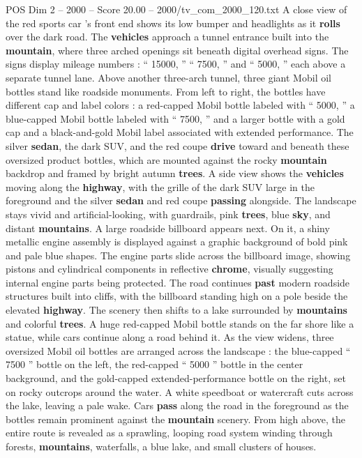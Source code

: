 \begin{textsample}{POS Dim 2 – 2000 – Score 20.00 – 2000/tv\_com\_2000\_120.txt}
A close view of the red sports car ’s front end shows its low bumper and headlights as it \textbf{rolls} over the dark road.
The \textbf{vehicles} approach a tunnel entrance built into the \textbf{mountain}, where three arched openings sit beneath digital overhead signs.
The signs display mileage numbers : “ 15000, ” “ 7500, ” and “ 5000, ” each above a separate tunnel lane.
Above another three-arch tunnel, three giant Mobil oil bottles stand like roadside monuments.
From left to right, the bottles have different cap and label colors : a red-capped Mobil bottle labeled with “ 5000, ” a blue-capped Mobil bottle labeled with “ 7500, ” and a larger bottle with a gold cap and a black-and-gold Mobil label associated with extended performance.
The silver \textbf{sedan}, the dark SUV, and the red coupe \textbf{drive} toward and beneath these oversized product bottles, which are mounted against the rocky \textbf{mountain} backdrop and framed by bright autumn \textbf{trees}.
A side view shows the \textbf{vehicles} moving along the \textbf{highway}, with the grille of the dark SUV large in the foreground and the silver \textbf{sedan} and red coupe \textbf{passing} alongside.
The landscape stays vivid and artificial-looking, with guardrails, pink \textbf{trees}, blue \textbf{sky}, and distant \textbf{mountains}.
A large roadside billboard appears next.
On it, a shiny metallic engine assembly is displayed against a graphic background of bold pink and pale blue shapes.
The engine parts slide across the billboard image, showing pistons and cylindrical components in reflective \textbf{chrome}, visually suggesting internal engine parts being protected.
The road continues \textbf{past} modern roadside structures built into cliffs, with the billboard standing high on a pole beside the elevated \textbf{highway}.
The scenery then shifts to a lake surrounded by \textbf{mountains} and colorful \textbf{trees}.
A huge red-capped Mobil bottle stands on the far shore like a statue, while cars continue along a road behind it.
As the view widens, three oversized Mobil oil bottles are arranged across the landscape : the blue-capped “ 7500 ” bottle on the left, the red-capped “ 5000 ” bottle in the center background, and the gold-capped extended-performance bottle on the right, set on rocky outcrops around the water.
A white speedboat or watercraft cuts across the lake, leaving a pale wake.
Cars \textbf{pass} along the road in the foreground as the bottles remain prominent against the \textbf{mountain} scenery.
From high above, the entire route is revealed as a sprawling, looping road system winding through forests, \textbf{mountains}, waterfalls, a blue lake, and small clusters of houses.

\end{textsample}
